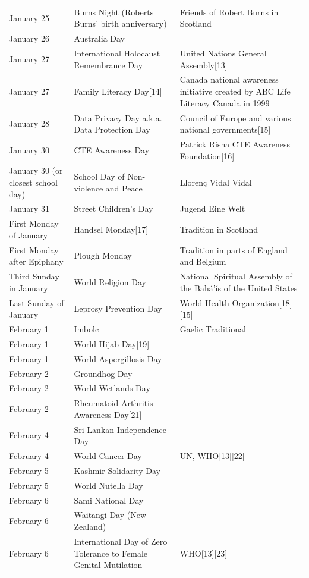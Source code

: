 \documentclass[
  openany]{book}
\begin{document}
\begin{longtable}[t]{>{\raggedright\arraybackslash}p{8em}>{\raggedright\arraybackslash}p{20em}>{\raggedright\arraybackslash}p{12em}}
January 25 & Burns Night (Roberts Burns' birth anniversary) & Friends of Robert Burns in Scotland\\
January 26 & Australia Day & \\
January 27 & International Holocaust Remembrance Day & United Nations General Assembly[13]\\
January 27 & Family Literacy Day[14] & Canada national awareness initiative created by ABC Life Literacy Canada in 1999\\
January 28 & Data Privacy Day a.k.a. Data Protection Day & Council of Europe and various national governments[15]\\
\addlinespace
January 30 & CTE Awareness Day & Patrick Risha CTE Awareness Foundation[16]\\
January 30 (or closest school day) & School Day of Non-violence and Peace & Llorenç Vidal Vidal\\
January 31 & Street Children's Day & Jugend Eine Welt\\
First Monday of January & Handsel Monday[17] & Tradition in Scotland\\
First Monday after Epiphany & Plough Monday & Tradition in parts of England and Belgium\\
\addlinespace
Third Sunday in January & World Religion Day & National Spiritual Assembly of the Bahá'ís of the United States\\
Last Sunday of January & Leprosy Prevention Day & World Health Organization[18][15]\\
February 1 & Imbolc & Gaelic Traditional\\
February 1 & World Hijab Day[19] & \\
February 1 & World Aspergillosis Day & [20]\\
\addlinespace
February 2 & Groundhog Day & \\
February 2 & World Wetlands Day & \\
February 2 & Rheumatoid Arthritis Awareness Day[21] & \\
February 4 & Sri Lankan Independence Day & \\
February 4 & World Cancer Day & UN, WHO[13][22]\\
\addlinespace
February 5 & Kashmir Solidarity Day & \\
February 5 & World Nutella Day & \\
February 6 & Sami National Day & \\
February 6 & Waitangi Day (New Zealand) & \\
February 6 & International Day of Zero Tolerance to Female Genital Mutilation & WHO[13][23]\\

\end{longtable}
\end{document}
